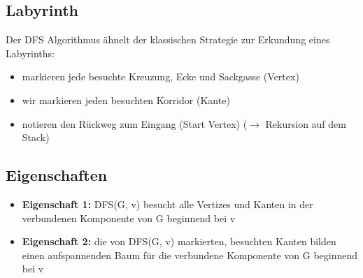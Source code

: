 \subsection{Labyrinth}
Der DFS Algorithmus ähnelt der klassischen Strategie zur Erkundung eines Labyrinths:
\begin{itemize}
    \item markieren jede besuchte Kreuzung, Ecke und Sackgasse (Vertex)
    \item wir markieren jeden besuchten Korridor (Kante)
    \item notieren den Rückweg zum Eingang (Start Vertex) ($\rightarrow$ Rekursion auf dem Stack)
\end{itemize}


\subsection{Eigenschaften}
\begin{itemize}
    \item \textbf{Eigenschaft 1:} DFS(G, v) besucht alle Vertizes und Kanten in der verbundenen Komponente von G beginnend bei v
    \item \textbf{Eigenschaft 2:} die von DFS(G, v) markierten, besuchten Kanten bilden einen aufspannenden Baum für die verbundene Komponente von G beginnend bei v
\end{itemize}

